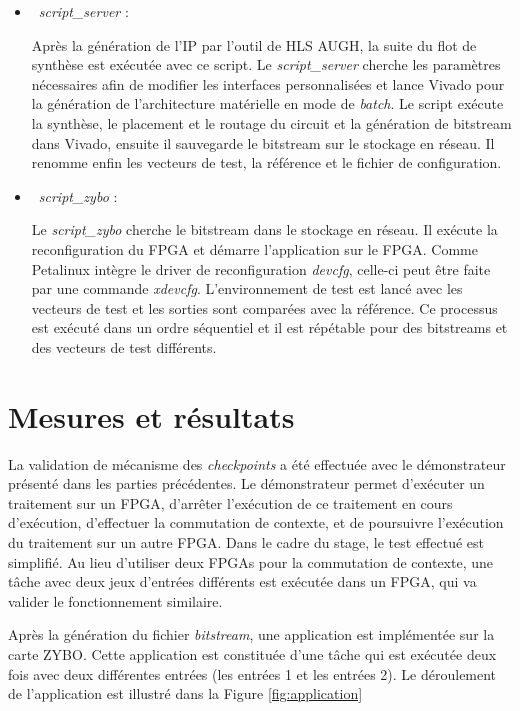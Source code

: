 \begin{itemize}
	\item\
	\emph{script\_server} :
	
	Après la génération de l'IP par l'outil de HLS AUGH, la suite du flot de synthèse est exécutée avec ce script. Le \emph{script\_server}
	cherche les paramètres nécessaires afin de modifier les interfaces personnalisées et lance Vivado pour la génération
	de l'architecture matérielle en mode de \emph{batch}. Le script exécute la synthèse, le placement et le routage du circuit et 
	la génération de bitstream dans Vivado, ensuite il sauvegarde le bitstream sur le stockage en réseau.
	Il renomme enfin les vecteurs de test, la référence et le fichier de configuration.

	\item\
	\emph{script\_zybo} :
	
	Le \emph{script\_zybo} cherche le bitstream dans le stockage en réseau. Il exécute la reconfiguration du FPGA et démarre
	l'application sur le FPGA. Comme Petalinux intègre le driver de reconfiguration \emph{devcfg}, celle-ci peut
	être faite par une commande \emph{xdevcfg}. L'environnement de test est lancé avec les vecteurs de test et les sorties
	sont comparées avec la référence. Ce processus est exécuté dans un ordre séquentiel et il est répétable pour des
	bitstreams et des vecteurs de test différents.
	
\end{itemize}

\section{Mesures et résultats}

La validation de mécanisme des \emph{checkpoints} a été effectuée avec le démonstrateur présenté dans les parties précédentes.
Le démonstrateur permet d'exécuter un traitement sur un FPGA, d'arrêter l'exécution de ce traitement en cours d'exécution,
d'effectuer la commutation de contexte, et de poursuivre l'exécution du traitement sur un autre FPGA.
Dans le cadre du stage, le test effectué est simplifié.
Au lieu d'utiliser deux FPGAs pour la commutation de contexte, une tâche avec deux jeux d'entrées différents est exécutée
dans un FPGA, qui va valider le fonctionnement similaire.

Après la génération du fichier \emph{bitstream}, une application est implémentée sur la carte ZYBO. Cette application est constituée
d'une tâche qui est exécutée deux fois avec deux différentes entrées (les entrées 1 et les entrées 2). Le déroulement de l'application
est illustré dans la Figure \ref{fig:application}

